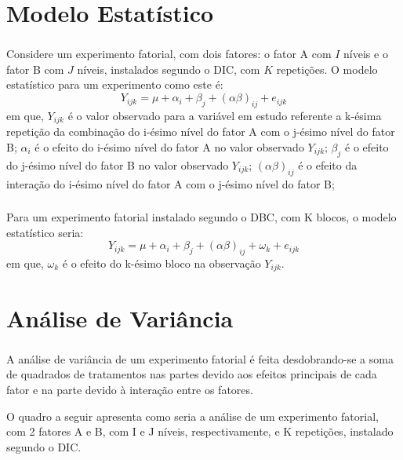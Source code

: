\documentclass[14pt,aspectratio=1610]{beamer}
\begin{document}
\section{Modelo Estatístico}
\begin{frame}{}
\frametitle{}
\begin{block}{}
\justifying
Considere um experimento fatorial, com dois fatores: o fator A com $I$
níveis e o fator B com $J$ níveis, instalados segundo o DIC, com $K$ repetições. O
modelo estatístico para um experimento como este é:
$$Y_{ijk}=\mu+\alpha_{i}+\beta_{j}+(\alpha\beta)_{ij}+e_{ijk}$$
em que, $Y_{ijk}$ é o valor observado para a variável em estudo referente a k-ésima
repetição da combinação do i-ésimo nível do fator A com o j-ésimo
nível do fator B; $\alpha_{i}$ é o efeito do i-ésimo nível do fator A no valor observado $Y_{ijk}$; $\beta_{j}$ é o efeito do j-ésimo nível do fator B no valor observado $Y_{ijk}$; $(\alpha\beta)_{ij}$ é o efeito da interação do i-ésimo nível do fator A com o j-ésimo nível do fator B;
\end{block}
\end{frame}

\begin{frame}{}
\frametitle{}
\begin{block}{}
\justifying
Para um experimento fatorial instalado segundo o DBC, com K blocos, o
modelo estatístico seria:
$$Y_{ijk}=\mu+\alpha_{i}+\beta_{j}+(\alpha\beta)_{ij}+\omega_{k}+e_{ijk}$$
em que, $\omega_{k}$ é o efeito do k-ésimo bloco na observação $Y_{ijk}.$
\end{block}
\end{frame}

\section{Análise de Variância}
\begin{frame}{}
\frametitle{}
\begin{block}{}
\justifying
A análise de variância de um experimento fatorial é feita desdobrando-se a
soma de quadrados de tratamentos nas partes devido aos efeitos principais de
cada fator e na parte devido à interação entre os fatores.
\end{block}
\pause
\begin{block}{}
\justifying
O quadro a seguir apresenta como seria a análise de um experimento
fatorial, com 2 fatores A e B, com I e J níveis, respectivamente, e K repetições,
instalado segundo o DIC.
\end{block}
\end{frame}
\end{document}
